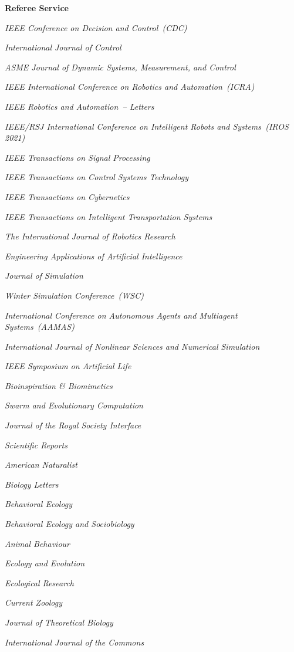 \documentclass[10pt]{article}
\newcommand{\halfblankline}{\quad\vspace{-0.5\baselineskip}\pagebreak[3]}
\begin{document}
\halfblankline

\textbf{Referee Service}
\begin{innerlist}
    \item \emph{IEEE Conference on Decision and Control~(CDC)}
    \item \emph{International Journal of Control}
    \item \emph{ASME Journal of Dynamic Systems, Measurement, and Control}
    \item \emph{IEEE International Conference on Robotics and Automation~(ICRA)}
    \item \emph{IEEE Robotics and Automation~-- Letters}
    \item \emph{IEEE/RSJ International Conference on Intelligent Robots and Systems~(IROS 2021)}
    \item \emph{IEEE Transactions on Signal Processing}
    \item \emph{IEEE Transactions on Control Systems Technology}
    \item \emph{IEEE Transactions on Cybernetics}
    \item \emph{IEEE Transactions on Intelligent Transportation Systems}
    \item \emph{The International Journal of Robotics Research}
    \item \emph{Engineering Applications of Artificial Intelligence}
    \item \emph{Journal of Simulation}
    \item \emph{Winter Simulation Conference~(WSC)}
    \item \emph{International Conference on Autonomous Agents and Multiagent Systems~(AAMAS)}
    \item \emph{International Journal of Nonlinear Sciences and Numerical Simulation}
    \item \emph{IEEE Symposium on Artificial Life}
    \item \emph{Bioinspiration \& Biomimetics}
    \item \emph{Swarm and Evolutionary Computation}
    \item \emph{Journal of the Royal Society Interface}
    \item \emph{Scientific Reports}
    \item \emph{American Naturalist}
    \item \emph{Biology Letters}
    \item \emph{Behavioral Ecology}
    \item \emph{Behavioral Ecology and Sociobiology}
    \item \emph{Animal Behaviour}
    \item \emph{Ecology and Evolution}
    \item \emph{Ecological Research}
    \item \emph{Current Zoology}
    \item \emph{Journal of Theoretical Biology}
    \item \emph{International Journal of the Commons}
\end{innerlist}
\end{document}
